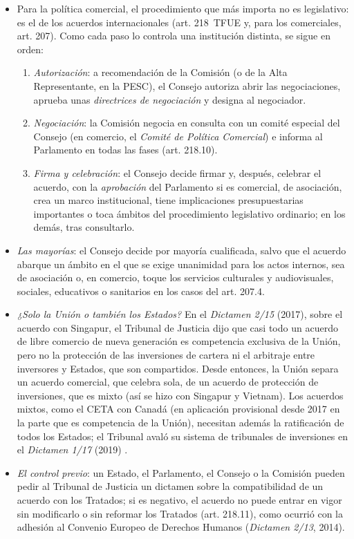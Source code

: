\documentclass[11pt]{article}
\begin{document}
\begin{itemize}
\item Para la política comercial, el procedimiento que más importa no es legislativo: es el de los acuerdos internacionales (art. 218~TFUE y, para los comerciales, art. 207). Como cada paso lo controla una institución distinta, se sigue en orden:
  \begin{enumerate}
  \item \emph{Autorización}: a recomendación de la Comisión (o de la Alta Representante, en la PESC), el Consejo autoriza abrir las negociaciones, aprueba unas \emph{directrices de negociación} y designa al negociador.
  \item \emph{Negociación}: la Comisión negocia en consulta con un comité especial del Consejo (en comercio, el \emph{Comité de Política Comercial}) e informa al Parlamento en todas las fases (art. 218.10).
  \item \emph{Firma y celebración}: el Consejo decide firmar y, después, celebrar el acuerdo, con la \emph{aprobación} del Parlamento si es comercial, de asociación, crea un marco institucional, tiene implicaciones presupuestarias importantes o toca ámbitos del procedimiento legislativo ordinario; en los demás, tras consultarlo.
  \end{enumerate}
\item \emph{Las mayorías}: el Consejo decide por mayoría cualificada, salvo que el acuerdo abarque un ámbito en el que se exige unanimidad para los actos internos, sea de asociación o, en comercio, toque los servicios culturales y audiovisuales, sociales, educativos o sanitarios en los casos del art. 207.4.
\item \emph{¿Solo la Unión o también los Estados?} En el \emph{Dictamen 2/15} (2017), sobre el acuerdo con Singapur\nocite{TJUE2017Dictamen215}, el Tribunal de Justicia dijo que casi todo un acuerdo de libre comercio de nueva generación es competencia exclusiva de la Unión, pero no la protección de las inversiones de cartera ni el arbitraje entre inversores y Estados, que son compartidos. Desde entonces, la Unión separa un acuerdo comercial, que celebra sola, de un acuerdo de protección de inversiones, que es mixto (así se hizo con Singapur y Vietnam). Los acuerdos mixtos, como el CETA con Canadá (en aplicación provisional desde 2017 en la parte que es competencia de la Unión), necesitan además la ratificación de todos los Estados; el Tribunal avaló su sistema de tribunales de inversiones en el \emph{Dictamen 1/17} (2019) .
\item \emph{El control previo}: un Estado, el Parlamento, el Consejo o la Comisión pueden pedir al Tribunal de Justicia un dictamen sobre la compatibilidad de un acuerdo con los Tratados; si es negativo, el acuerdo no puede entrar en vigor sin modificarlo o sin reformar los Tratados (art. 218.11), como ocurrió con la adhesión al Convenio Europeo de Derechos Humanos (\emph{Dictamen 2/13}, 2014).
\end{itemize}
\end{document}
